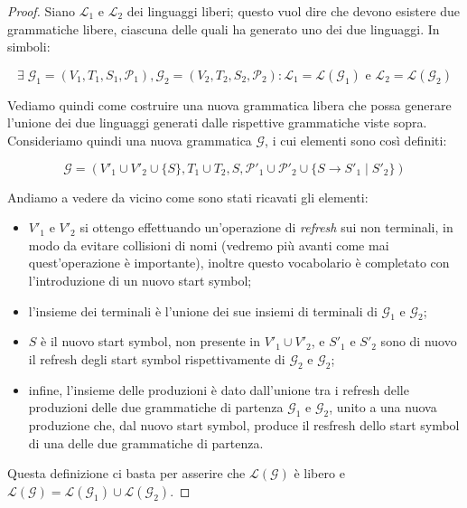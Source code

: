 \documentclass[class=book, crop=false, oneside, 12pt]{standalone}
\begin{document}
\begin{proof}
    Siano \(\mathcal{L}_1\) e \(\mathcal{L}_2\) dei linguaggi liberi; questo vuol dire che devono esistere due grammatiche libere, ciascuna delle quali ha generato uno dei due linguaggi. In simboli:

  \begin{equation*}
    \exists\; \mathcal{G}_1 = (V_1, T_1, S_1, \mathcal{P}_1), \mathcal{G}_2 = (V_2, T_2, S_2, \mathcal{P}_2) : \mathcal{L}_1 = \mathcal{L}(\mathcal{G}_1) \textrm{ e } \mathcal{L}_2 = \mathcal{L}(\mathcal{G}_2)
  \end{equation*}

  Vediamo quindi come costruire una nuova grammatica libera che possa generare l'unione dei due linguaggi generati dalle rispettive grammatiche viste sopra. Consideriamo quindi una nuova grammatica \(\mathcal{G}\), i cui elementi sono così definiti:

  \begin{equation*}
      \mathcal{G} = (V'_1 \cup V'_2 \cup \{S\}, T_1 \cup T_2, S, \mathcal{P}'_1 \cup \mathcal{P}'_2 \cup \{S \rightarrow S'_1 \mid S'_2\})
  \end{equation*}

  \noindent Andiamo a vedere da vicino come sono stati ricavati gli elementi:

  \begin{itemize}
    \item \(V'_1\) e \(V'_2\) si ottengo effettuando un'operazione di \emph{refresh} sui non terminali, in modo da evitare collisioni di nomi (vedremo più avanti come mai quest'operazione è importante), inoltre questo vocabolario è completato con l'introduzione di un nuovo start symbol;
    \item l'insieme dei terminali è l'unione dei sue insiemi di terminali di \(\mathcal{G}_1\) e \(\mathcal{G}_2\);
    \item \(S\) è il nuovo start symbol, non presente in \(V'_1 \cup V'_2\), e \(S'_1\) e \(S'_2\) sono di nuovo il refresh degli start symbol rispettivamente di \(\mathcal{G}_2\) e \(\mathcal{G}_2\);
    \item infine, l'insieme delle produzioni è dato dall'unione tra i refresh delle produzioni delle due grammatiche di partenza  \(\mathcal{G}_1\) e \(\mathcal{G}_2\), unito a una nuova produzione che, dal nuovo start symbol, produce il resfresh dello start symbol di una delle due grammatiche di partenza.
  \end{itemize}

  \noindent Questa definizione ci basta per asserire che \(\mathcal{L(G)}\) è libero e \(\mathcal{L(G)} = \mathcal{L}(\mathcal{G}_1)  \cup \mathcal{L}(\mathcal{G}_2) \).

\end{proof}
\end{document}
